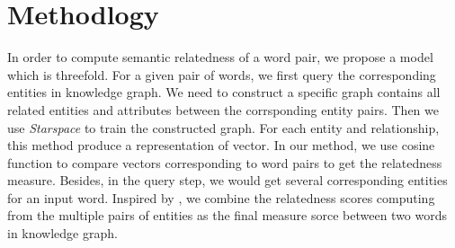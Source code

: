 \section{Methodlogy}
\label{methodlogy}
In order to compute semantic relatedness of a word pair, we propose a model which is
threefold. 
For a given pair of words, we first query the corresponding entities in knowledge graph.
We need to construct a specific graph contains all related entities and attributes between the 
corrsponding entity pairs. Then we use \emph{Starspace} to train the constructed 
graph. For each entity and relationship, this method produce a representation of vector.
In our method, we use cosine function to compare vectors corresponding to word pairs to get the relatedness measure.
Besides, in the query step, we would get several corresponding entities for an input word. Inspired by
\cite{acl/IacobacciPN15}, we combine the relatedness scores computing from the multiple pairs of entities 
as the final measure sorce between two words in knowledge graph.

\begin{table*}[]
    \small
    \centering
    \caption{Query Entity (DBPedia: http://dbpedia.org/resource/)}
    \label{entities}
    \renewcommand\arraystretch{1.6}
\end{table*}

